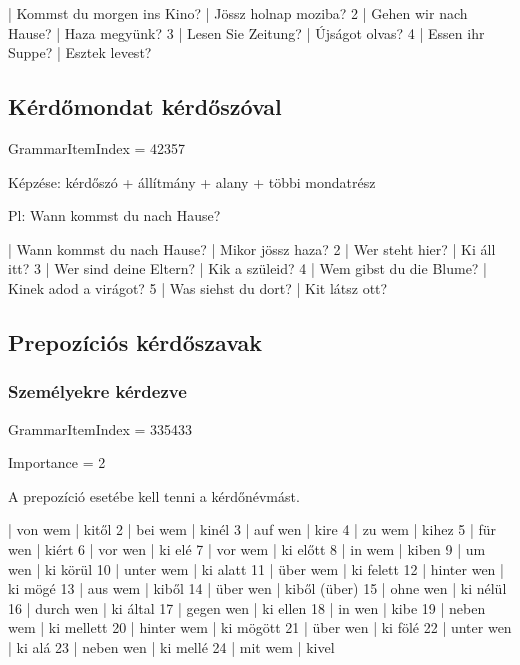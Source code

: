 \documentclass{article}
\newenvironment{desc}{\verbatim}{\endverbatim}
\newenvironment{exmp}{\verbatim}{\endverbatim}
\begin{document}
\begin{exmp}
1 | Kommst du morgen ins Kino? | Jössz holnap moziba?
2 | Gehen wir nach Hause? | Haza megyünk?
3 | Lesen Sie Zeitung? | Újságot olvas?
4 | Essen ihr Suppe? | Esztek levest?
\end{exmp}

\subsection{Kérdőmondat kérdőszóval}

GrammarItemIndex = 42357

\begin{desc}
Képzése: kérdőszó + állítmány + alany + többi mondatrész

Pl: Wann kommst du nach Hause?
\end{desc}

\begin{exmp}
1 | Wann kommst du nach Hause? | Mikor jössz haza?
2 | Wer steht hier? | Ki áll itt?
3 | Wer sind deine Eltern? | Kik a szüleid?
4 | Wem gibst du die Blume? | Kinek adod a virágot?
5 | Was siehst du dort? | Kit látsz ott?
\end{exmp}

\subsection{Prepozíciós kérdőszavak}

\subsubsection{Személyekre kérdezve}

GrammarItemIndex = 335433

Importance = 2

\begin{desc}
A prepozíció esetébe kell tenni a kérdőnévmást.
\end{desc}

\begin{exmp}
1 | von wem | kitől
2 | bei wem | kinél
3 | auf wen | kire
4 | zu wem | kihez
5 | für wen | kiért
6 | vor wen | ki elé
7 | vor wem | ki előtt
8 | in wem | kiben
9 | um wen | ki körül
10 | unter wem | ki alatt
11 | über wem | ki felett
12 | hinter wen | ki mögé
13 | aus wem | kiből
14 | über wen | kiből (über)
15 | ohne wen | ki nélül
16 | durch wen | ki által
17 | gegen wen | ki ellen
18 | in wen | kibe
19 | neben wem | ki mellett
20 | hinter wem | ki mögött
21 | über wen | ki fölé
22 | unter wen | ki alá
23 | neben wen | ki mellé
24 | mit wem | kivel
\end{exmp}
\end{document}
